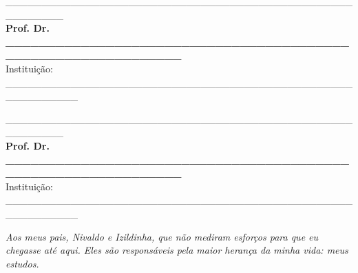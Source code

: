 \documentclass[
	12pt,				%
	oneside,			%
	a4paper,			%
	english,			%
	brazil				%
	]{abntex2ppgsi}
\begin{document}
\begin{folhadeaprovacao}
\begin{center}
\_\_\_\_\_\_\_\_\_\_\_\_\_\_\_\_\_\_\_\_\_\_\_\_\_\_\_\_\_\_\_\_\_\_\_\_\_\_\_\_\_\_\_\_\_\_\_\_\_\_\_\_\_\_\_\_
\vspace*{0.2cm} 
\\ \textbf{Prof. Dr. \_\_\_\_\_\_\_\_\_\_\_\_\_\_\_\_\_\_\_\_\_\_\_\_\_\_\_\_\_\_\_\_\_\_\_\_\_\_\_\_\_\_\_\_\_\_\_\_\_\_\_\_\_\_\_\_\_\_\_\_\_\_} 
\\ \vspace*{0.2cm} 
Instituição: \_\_\_\_\_\_\_\_\_\_\_\_\_\_\_\_\_\_\_\_\_\_\_\_\_\_\_\_\_\_\_\_\_\_\_\_\_\_\_\_\_\_\_\_\_\_\_\_\_\_\_\_\_\_\_\_\_\_

\vspace*{2cm}

\_\_\_\_\_\_\_\_\_\_\_\_\_\_\_\_\_\_\_\_\_\_\_\_\_\_\_\_\_\_\_\_\_\_\_\_\_\_\_\_\_\_\_\_\_\_\_\_\_\_\_\_\_\_\_\_
\vspace*{0.2cm} 
\\ \textbf{Prof. Dr. \_\_\_\_\_\_\_\_\_\_\_\_\_\_\_\_\_\_\_\_\_\_\_\_\_\_\_\_\_\_\_\_\_\_\_\_\_\_\_\_\_\_\_\_\_\_\_\_\_\_\_\_\_\_\_\_\_\_\_\_\_\_} 
\\ \vspace*{0.2cm} 
Instituição: \_\_\_\_\_\_\_\_\_\_\_\_\_\_\_\_\_\_\_\_\_\_\_\_\_\_\_\_\_\_\_\_\_\_\_\_\_\_\_\_\_\_\_\_\_\_\_\_\_\_\_\_\_\_\_\_\_\_

\end{center}
  
\end{folhadeaprovacao}

%
% 
\begin{dedicatoria}
   \vspace*{\fill}
   \centering
   \noindent
   \textit{Aos meus pais, Nivaldo e Izildinha, que não mediram esforços para que eu chegasse até aqui. Eles são responsáveis pela maior herança da minha vida: meus estudos.} 
	 \vspace*{\fill}
\end{dedicatoria}

%
% 
%
\end{document}
